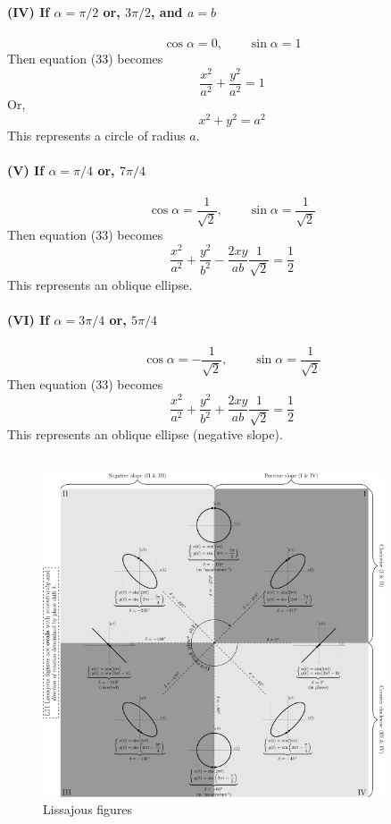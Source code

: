 \documentclass[12pt]{article}
\begin{document}
\textbf{(IV) If $\alpha=\pi/2$ or, $3\pi/2$, and $a=b$}\\~\\
\[ \cos{\alpha} = 0, \qquad \sin{\alpha} = 1 \]
Then equation (33) becomes \[
    \frac{x^2}{a^2} + \frac{y^2}{a^2} = 1
\]
Or, \[
    x^2 + y^2 = a^2
\]
This represents a circle of radius $a$.\\~\\

\textbf{(V) If $\alpha=\pi/4$ or, $7\pi/4$}\\~\\
\[ \cos{\alpha} = \frac{1}{\sqrt{2}}, \qquad \sin{\alpha} = \frac{1}{\sqrt{2}} \]
Then equation (33) becomes \[
    \frac{x^2}{a^2} + \frac{y^2}{b^2} - \frac{2xy}{ab} \frac{1}{\sqrt{2}} = \frac{1}{2}
\]
This represents an oblique ellipse.\\~\\

\textbf{(VI) If $\alpha=3\pi/4$ or, $5\pi/4$}\\~\\
\[ \cos{\alpha} = -\frac{1}{\sqrt{2}}, \qquad \sin{\alpha} = \frac{1}{\sqrt{2}} \]
Then equation (33) becomes \[
    \frac{x^2}{a^2} + \frac{y^2}{b^2} + \frac{2xy}{ab} \frac{1}{\sqrt{2}} = \frac{1}{2}
\]
This represents an oblique ellipse (negative slope).\\~\\

\begin{figure}[htpb]
    \centering
    \includegraphics[width=0.9\textwidth]{Lissajous.png}
    \caption{Lissajous figures}
    \label{fig:Lissajous-png}
\end{figure}
\end{document}
